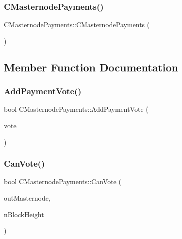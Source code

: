 \subsubsection{\texorpdfstring{C\+Masternode\+Payments()}{CMasternodePayments()}}
{\footnotesize\ttfamily C\+Masternode\+Payments\+::\+C\+Masternode\+Payments (\begin{DoxyParamCaption}{ }\end{DoxyParamCaption})\hspace{0.3cm}{\ttfamily [inline]}}



\subsection{Member Function Documentation}
\mbox{\label{class_c_masternode_payments_a90c4db8f9eaf3749ecbed6a0840333bb}} 
\subsubsection{\texorpdfstring{Add\+Payment\+Vote()}{AddPaymentVote()}}
{\footnotesize\ttfamily bool C\+Masternode\+Payments\+::\+Add\+Payment\+Vote (\begin{DoxyParamCaption}\item[{const \mbox{\hyperlink{class_c_masternode_payment_vote}{C\+Masternode\+Payment\+Vote}} \&}]{vote }\end{DoxyParamCaption})}

\mbox{\label{class_c_masternode_payments_ad0891106128d392e1cb4206061b4aec4}} 
\subsubsection{\texorpdfstring{Can\+Vote()}{CanVote()}}
{\footnotesize\ttfamily bool C\+Masternode\+Payments\+::\+Can\+Vote (\begin{DoxyParamCaption}\item[{C\+Out\+Point}]{out\+Masternode,  }\item[{int}]{n\+Block\+Height }\end{DoxyParamCaption})}

